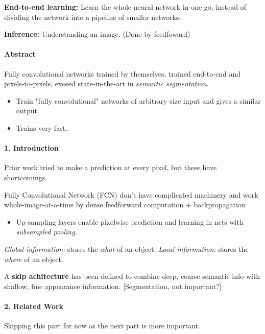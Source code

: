 \documentclass[]{article}
\let\oldparagraph\paragraph
\renewcommand{\paragraph}[1]{\oldparagraph{#1}\mbox{}}
\begin{document}
\textbf{End-to-end learning:} Learn the whole neural network in one go,
instead of dividing the network into a pipeline of smaller networks.

\textbf{Inference:} Understanding an image. (Done by feedfoward)

\paragraph{Abstract}\label{header-n20}

Fully convolutional networks trained by themselves, trained end-to-end
and pixels-to-pixels, exceed state-in-the-art in \emph{semantic
segmentation}.

\begin{itemize}
\item
  Train "fully convolutional" networks of arbitrary size input and gives
  a similar output.
\item
  Trains very fast.
\end{itemize}

\paragraph{1. Introduction}\label{header-n30}

Prior work tried to make a prediction at every pixel, but these have
shortcomings.

Fully Convolutional Network (FCN) don't have complicated machinery and
work whole-image-at-a-time by dense feedforward computation +
backpropagation

\begin{itemize}
\item
  Up-sampling layers enable pixelwise prediction and learning in nets
  with \emph{subsampled pooling}.
\end{itemize}

\emph{Global information:} stores the \emph{what} of an object.
\emph{Local information:} stores the \emph{where} of an object.

A \textbf{skip achitecture} has been defined to combine deep, coarse
semantic info with shallow, fine appearance information.
{[}Segmentation, not important?{]}

\paragraph{2. Related Work}\label{header-n44}

Skipping this part for now as the next part is more important.
\end{document}
